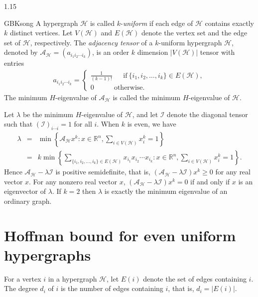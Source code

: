 \documentclass[preprint,12pt]{elsarticle}
\begin{document}
\begin{spacing}{1.15}
\begin{CJK*}{GBK}{song}
A hypergraph $\mathcal{H}$ is called $k$-\textit{uniform} if each edge of $\mathcal{H}$ contains exactly $k$ distinct vertices. Let $V(\mathcal{H})$ and $E(\mathcal{H})$ denote the vertex set and the edge set of $\mathcal{H}$, respectively. The \textit{adjacency tensor} \cite{Cooper} of a $k$-uniform hypergraph $\mathcal{H}$, denoted by $\mathcal{A}_{\mathcal{H}}=(a_{i_1i_2\cdots i_k})$, is an order $k$ dimension $|V(\mathcal{H})|$ tensor with entries
\begin{eqnarray*}
a_{i_1i_2\cdots i_k}=\begin{cases}\frac{1}{(k-1)!}~~~~~~~\mbox{if}~\{i_1,i_2,\ldots,i_k\}\in E(\mathcal{H}),\\
0~~~~~~~~~~~~~\mbox{otherwise}.\end{cases}
\end{eqnarray*}
The minimum $H$-eigenvalue of $\mathcal{A}_{\mathcal{H}}$ is called the minimum $H$-eigenvalue of $\mathcal{H}$.

Let $\lambda$ be the minimum $H$-eigenvalue of $\mathcal{H}$, and let $\mathcal{I}$ denote the diagonal tensor such that $(\mathcal{I})_{i\cdots i}=1$ for all $i$. When $k$ is even, we have
\begin{eqnarray*}
\lambda&=&\min\left\{\mathcal{A}_{\mathcal{H}}x^k:x\in{\mathbb{R}^n},\sum_{i\in V(\mathcal{H})}x_i^k=1\right\}\\
&=&k\min\left\{\sum_{\{ i_1,i_2,\ldots,i_k\}\in E(\mathcal{H})}x_{i_1}x_{i_2}\cdots x_{i_k}:x\in{\mathbb{R}^n},\sum_{i\in V(\mathcal{H})}x_i^k=1\right\}.
\end{eqnarray*}
Hence $\mathcal{A}_{\mathcal{H}}-\lambda\mathcal{I}$ is positive semidefinite, that is, $(\mathcal{A}_{\mathcal{H}}-\lambda\mathcal{I})x^k\geq0$ for any real vector $x$. For any nonzero real vector $x$, $(\mathcal{A}_{\mathcal{H}}-\lambda\mathcal{I})x^k=0$ if and only if $x$ is an eigenvector of $\lambda$. If $k=2$ then $\lambda$ is exactly the minimum eigenvalue of an ordinary graph.

\section{Hoffman bound for even uniform hypergraphs}
For a vertex $i$ in a hypergraph $\mathcal{H}$, let $E(i)$ denote the set of edges containing $i$. The degree $d_i$ of $i$ is the number of edges containing $i$, that is, $d_i=|E(i)|$.


\end{CJK*}
\end{spacing}
\end{document}
